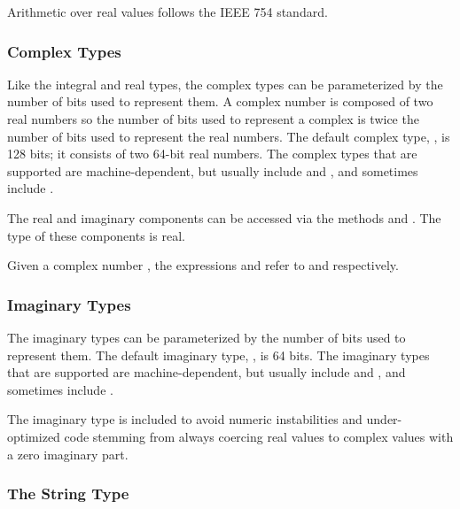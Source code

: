Arithmetic over real values follows the IEEE 754 standard.

\subsubsection{Complex Types}
\label{Complex_Types}

Like the integral and real types, the complex types can be
parameterized by the number of bits used to represent them.  A complex
number is composed of two real numbers so the number of bits used to
represent a complex is twice the number of bits used to represent the
real numbers.  The default complex type, , is 128 bits;
it consists of two 64-bit real numbers.  The complex types that are
supported are machine-dependent, but usually
include  and , and sometimes
include .

The real and imaginary components can be accessed via the methods
 and .  The type of these components is real.

\begin{example}
Given a complex number , the expressions
 and  refer to  and 
respectively.
\end{example}

\subsubsection{Imaginary Types}
\label{Imaginary_Types}

The imaginary types can be parameterized by the number of bits used to
represent them.  The default imaginary type, , is 64 bits.
The imaginary types that are supported are machine-dependent, but
usually include  and , and sometimes
include .

\begin{rationale}
The imaginary type is included to avoid numeric instabilities and
under-optimized code stemming from always coercing real values to
complex values with a zero imaginary part.
\end{rationale}

\subsubsection{The String Type}
\label{The_String_Type}

